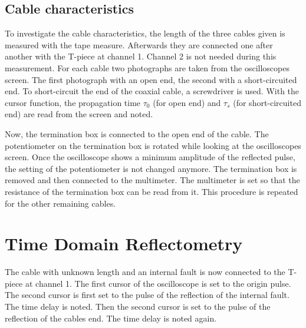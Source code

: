         \subsection{Cable characteristics}
            To investigate the cable characteristics, the length of the three cables given is measured with the tape measure.
            Afterwards they are connected one after another with the T-piece at channel 1. Channel 2 is not needed during this
            measurement. For each cable two photographs are taken from the oscilloscopes screen. The first photograph with an open
            end, the second with a short-circuited end. To short-circuit the end of the coaxial cable, a screwdriver is used. With
            the cursor function, the propagation time \(\tau_0\) (for open end) and \(\tau_s\) (for short-circuited end) are read from
            the screen and noted.\par
            Now, the termination box is connected to the open end of the cable. The potentiometer on the termination box is rotated
            while looking at the oscilloscopes screen. Once the oscilloscope shows a minimum amplitude of the reflected pulse, the
            setting of the potentiometer is not changed anymore. The termination box is removed and then connected to the multimeter.
            The multimeter is set so that the resistance of the termination box can be read from it. This procedure is repeated for
            the other remaining cables.
    \section{Time Domain Reflectometry}
        The cable with unknown length and an internal fault is now connected to the T-piece at channel 1. The first cursor of the
        oscilloscope is set to the origin pulse. The second cursor is first set to the pulse of the reflection of the internal
        fault. The time delay is noted. Then the second cursor is set to the pulse of the reflection of the cables end. The time
        delay is noted again.